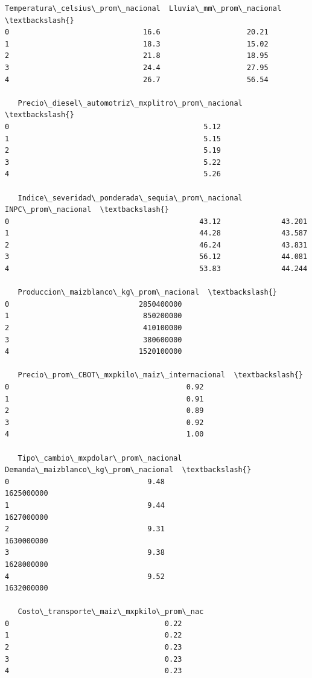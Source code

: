 \documentclass[11pt]{article}
\makeatletter
\newcommand{\boxspacing}{\kern\kvtcb@left@rule\kern\kvtcb@boxsep}
\newcommand{\prompt}[4]{
        {\ttfamily\llap{{\color{#2}[#3]:\hspace{3pt}#4}}\vspace{-\baselineskip}}
    }
\makeatother
\begin{document}
            \begin{tcolorbox}[breakable, size=fbox, boxrule=.5pt, pad at break*=1mm, opacityfill=0]
\prompt{Out}{outcolor}{33}{\boxspacing}
\begin{Verbatim}[commandchars=\\\{\}]
   Temperatura\_celsius\_prom\_nacional  Lluvia\_mm\_prom\_nacional  \textbackslash{}
0                               16.6                    20.21
1                               18.3                    15.02
2                               21.8                    18.95
3                               24.4                    27.95
4                               26.7                    56.54

   Precio\_diesel\_automotriz\_mxplitro\_prom\_nacional  \textbackslash{}
0                                             5.12
1                                             5.15
2                                             5.19
3                                             5.22
4                                             5.26

   Indice\_severidad\_ponderada\_sequia\_prom\_nacional  INPC\_prom\_nacional  \textbackslash{}
0                                            43.12              43.201
1                                            44.28              43.587
2                                            46.24              43.831
3                                            56.12              44.081
4                                            53.83              44.244

   Produccion\_maizblanco\_kg\_prom\_nacional  \textbackslash{}
0                              2850400000
1                               850200000
2                               410100000
3                               380600000
4                              1520100000

   Precio\_prom\_CBOT\_mxpkilo\_maiz\_internacional  \textbackslash{}
0                                         0.92
1                                         0.91
2                                         0.89
3                                         0.92
4                                         1.00

   Tipo\_cambio\_mxpdolar\_prom\_nacional  Demanda\_maizblanco\_kg\_prom\_nacional  \textbackslash{}
0                                9.48                           1625000000
1                                9.44                           1627000000
2                                9.31                           1630000000
3                                9.38                           1628000000
4                                9.52                           1632000000

   Costo\_transporte\_maiz\_mxpkilo\_prom\_nac
0                                    0.22
1                                    0.22
2                                    0.23
3                                    0.23
4                                    0.23
\end{Verbatim}
\end{tcolorbox}
        
\end{document}
